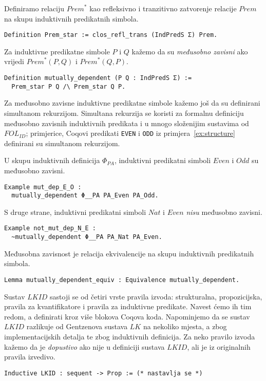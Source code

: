 \begin{definition}
  Definiramo relaciju \(\mathit{Prem}^{\ast}\) kao refleksivno i tranzitivno zatvorenje relacije \(\mathit{Prem}\) na skupu induktivnih predikatnih simbola.
\begin{verbatim}
Definition Prem_star := clos_refl_trans (IndPredS Σ) Prem.
\end{verbatim}
  \noindent Za induktivne predikatne simbole \(P\) i \(Q\) kažemo da su
  \textit{međusobno zavisni} ako vrijedi \(\mathit{Prem}^{\ast}(P, Q)\) i \(\mathit{Prem}^{\ast}(Q, P)\).
\begin{verbatim}
Definition mutually_dependent (P Q : IndPredS Σ) :=
  Prem_star P Q /\ Prem_star Q P.
\end{verbatim}
  \noindent Za međusobno zavisne induktivne predikatne simbole kažemo još da su
  definirani simultanom rekurzijom.
  Simultana rekurzija se koristi za formalnu definiciju međusobno zavisnih induktivnih predikata
  i u mnogo složenijim sustavima od \(\mathit{FOL}_{\mathit{ID}}\); primjerice,
  Coqovi predikati \texttt{EVEN} i \texttt{ODD} iz primjera~\ref{ex:structure}
  definirani su simultanom rekurzijom.
\end{definition}

\begin{example}
  U skupu induktivnih definicija \(\Phi_{\mathit{PA}}\),
  induktivni predikatni simboli \(\mathit{Even}\) i \(\mathit{Odd}\)
  su međusobno zavisni.
\begin{verbatim}
Example mut_dep_E_O :
  mutually_dependent Φ__PA PA_Even PA_Odd.
\end{verbatim}
  \noindent S druge strane, induktivni predikatni simboli \(\mathit{Nat}\) i \(\mathit{Even}\)
  \textit{nisu} međusobno zavisni.
\begin{verbatim}
Example not_mut_dep_N_E :
  ~mutually_dependent Φ__PA PA_Nat PA_Even.
\end{verbatim}
\end{example}

\begin{lemma}
  Međusobna zavisnost je relacija ekvivalencije na skupu induktivnih predikatnih simbola.
\begin{verbatim}
Lemma mutually_dependent_equiv : Equivalence mutually_dependent.
\end{verbatim}
\end{lemma}

Sustav \(\mathit{LKID}\) sastoji se od četiri vrste pravila izvoda:
strukturalna, propozicijska, pravila za kvantifikatore i pravila za induktivne predikate.
Navest ćemo ih tim redom, a definirati kroz više blokova Coqova koda.
Napominjemo da se sustav \(\mathit{LKID}\) razlikuje od Gentzenova sustava \(\mathit{LK}\)
na nekoliko mjesta, a zbog implementacijskih detalja te zbog induktivnih definicija.
Za neko pravilo izvoda kažemo da je \textit{dopustivo} ako nije u definiciji sustava \(\mathit{LKID}\),
ali je iz originalnih pravila izvedivo.
\begin{verbatim}
Inductive LKID : sequent -> Prop := (* nastavlja se *)
\end{verbatim}
